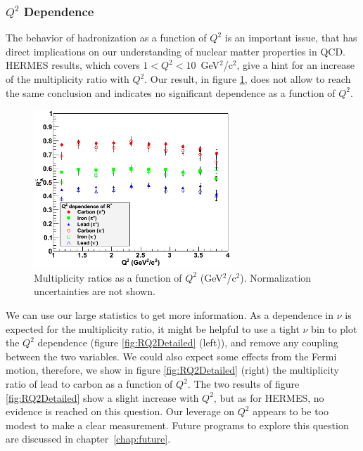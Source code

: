 \subsubsection{$Q^2$ Dependence}

The behavior of hadronization as a function of $Q^2$ is an important issue, that 
has direct implications on our understanding of nuclear matter properties in 
QCD. HERMES results, which covers $1<Q^2<10$~GeV$^2$/c$^2$, give a hint for an 
increase of the multiplicity ratio with $Q^2$. Our result, in figure 
\ref{fig:RQ2}, does not allow to reach the same conclusion and indicates no 
significant dependence as a function of $Q^2$.

\begin{figure}[tbp]
\centering
\includegraphics[width=7.4cm] {chap6-fig/F_RvQ2.png} 
\caption {Multiplicity ratios as a function of $Q^2$ (GeV$^2$/c$^2$). 
Normalization uncertainties are not shown.}
\label{fig:RQ2}
\end{figure}

We can use our large statistics to get more information. As 
a dependence in $\nu$ is expected for the multiplicity ratio, it might be helpful to use a tight 
$\nu$ bin to plot the $Q^2$ dependence (figure \ref{fig:RQ2Detailed} (left)), 
and remove any coupling between the two variables.
We could also expect some effects from the Fermi motion, 
therefore, we show in figure \ref{fig:RQ2Detailed} (right) the multiplicity ratio of lead to 
carbon as a function of $Q^2$. The two results of figure \ref{fig:RQ2Detailed} 
show a slight increase with $Q^2$, but as for HERMES, no evidence is 
reached on this question. Our leverage on $Q^2$ appears to be too modest
to make a clear measurement. Future programs to explore this question are 
discussed in chapter~\ref{chap:future}.

